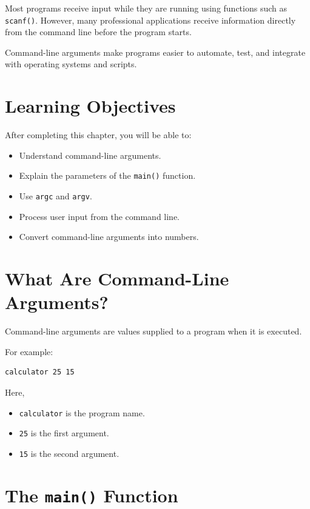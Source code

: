 \documentclass[12pt,openany]{book}
\begin{document}
Most programs receive input while they are running using functions such as \texttt{scanf()}. However, many professional applications receive information directly from the command line before the program starts.

Command-line arguments make programs easier to automate, test, and integrate with operating systems and scripts.

\section{Learning Objectives}

After completing this chapter, you will be able to:

\begin{itemize}
    \item Understand command-line arguments.
    \item Explain the parameters of the \texttt{main()} function.
    \item Use \texttt{argc} and \texttt{argv}.
    \item Process user input from the command line.
    \item Convert command-line arguments into numbers.
\end{itemize}

\section{What Are Command-Line Arguments?}

Command-line arguments are values supplied to a program when it is executed.

For example:

\begin{lstlisting}
calculator 25 15
\end{lstlisting}

Here,

\begin{itemize}
    \item \texttt{calculator} is the program name.
    \item \texttt{25} is the first argument.
    \item \texttt{15} is the second argument.
\end{itemize}

\section{The \texttt{main()} Function}
\end{document}
